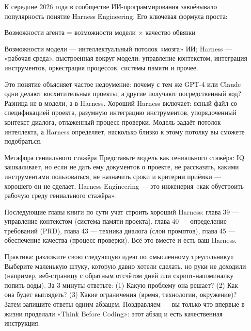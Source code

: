 
К середине 2026 года в сообществе ИИ-программирования завоёвывало популярность понятие Harness Engineering. Его ключевая формула проста:

Возможности агента = возможности модели × качество обвязки

Возможности модели — интеллектуальный потолок «мозга» ИИ; Harness — «рабочая среда», выстроенная вокруг модели: управление контекстом, интеграция инструментов, оркестрация процессов, системы памяти и прочее.

Это понятие объясняет частое недоумение: почему с тем же GPT-4 или Claude одни делают восхитительные проекты, а другие получают посредственный код? Разница не в модели, а в Harness. Хороший Harness включает: ясный файл со спецификацией проекта, разумную интеграцию инструментов, упорядоченный контекст диалога, отлаженный процесс проверки. Модель задаёт потолок интеллекта, а Harness определяет, насколько близко к этому потолку вы сможете подобраться.

\begin{tcbinfo}{Метафора гениального стажёра}
Представьте модель как гениального стажёра: IQ зашкаливает, но если не дать ему документов о проекте, не рассказать, какими инструментами пользоваться, не назначить сроки и критерии приёмки — хорошего он не сделает. Harness Engineering — это инженерия «как обустроить рабочую среду гениального стажёра».

\end{tcbinfo}

Последующие главы книги по сути учат строить хороший Harness: глава 39 — управление контекстом (система памяти проекта), глава 40 — определение требований (PRD), глава 43 — техника диалога (слои промптов), глава 45 — обеспечение качества (процесс проверки). Всё это вместе и есть ваш Harness.

\begin{tcbpractice}{Практика: разложите свою следующую идею по «мысленному треугольнику»}
Выберите маленькую штуку, которую давно хотели сделать, но руки не доходили (например, веб-страницу с обратным отсчётом дней или скрипт-напоминалку попить воды). За 3 минуты ответьте: (1) Какую проблему она решает? (2) Как она будет выглядеть? (3) Какие ограничения (время, технологии, окружение)? Затем запишите ответы одним абзацем. Поздравляем — вы только что впервые в жизни проделали «Think Before Coding»: этот абзац и есть качественная инструкция.

\end{tcbpractice}

